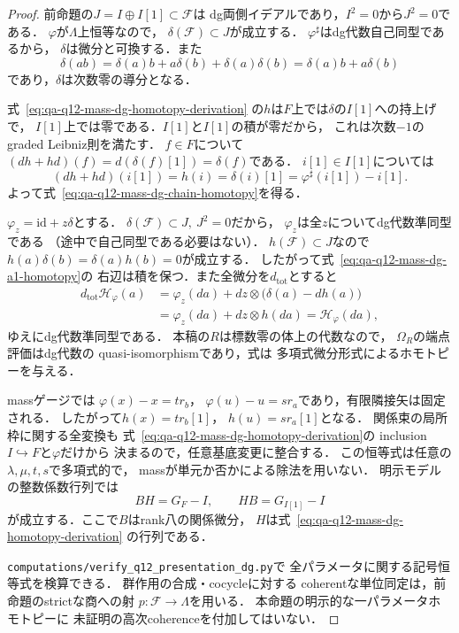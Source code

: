 \begin{proof}
前命題の$J=I\oplus I[1]\subset\mathscr F$は
dg両側イデアルであり，$I^2=0$から$J^2=0$である．
$\varphi$が$\Lambda$上恒等なので，
$\delta(\mathscr F)\subset J$が成立する．
$\varphi^\sharp$はdg代数自己同型であるから，
$\delta$は微分と可換する．また
\[
 \delta(ab)=\delta(a)b+a\delta(b)+\delta(a)\delta(b)
           =\delta(a)b+a\delta(b)
\]
であり，$\delta$は次数零の導分となる．

式~\eqref{eq:qa-q12-mass-dg-homotopy-derivation}
の$h$は$F$上では$\delta$の$I[1]$への持上げで，
$I[1]$上では零である．$I[1]$と$I[1]$の積が零だから，
これは次数$-1$のgraded Leibniz則を満たす．
$f\in F$について
$(dh+hd)(f)=d(\delta(f)[1])=\delta(f)$である．
$i[1]\in I[1]$については
\[
 (dh+hd)(i[1])=h(i)=\delta(i)[1]
             =\varphi^\sharp(i[1])-i[1] .
\]
よって式~\eqref{eq:qa-q12-mass-dg-chain-homotopy}を得る．

$\varphi_z=\mathrm{id}+z\delta$とする．
$\delta(\mathscr F)\subset J,\ J^2=0$だから，
$\varphi_z$は全$z$についてdg代数準同型である
（途中で自己同型である必要はない）．
$h(\mathscr F)\subset J$なので
$h(a)\delta(b)=\delta(a)h(b)=0$が成立する．
したがって式~\eqref{eq:qa-q12-mass-dg-a1-homotopy}の
右辺は積を保つ．また全微分を$d_{\mathrm{tot}}$とすると
\[
 \begin{aligned}
 d_{\mathrm{tot}}\mathscr H_\varphi(a)
 &=\varphi_z(da)+dz\otimes
       \bigl(\delta(a)-dh(a)\bigr)\\
 &=\varphi_z(da)+dz\otimes h(da)
  =\mathscr H_\varphi(da),
 \end{aligned}
\]
ゆえにdg代数準同型である．
本稿の$R$は標数零の体上の代数なので，
$\Omega_R$の端点評価はdg代数の
quasi-isomorphismであり，式は
多項式微分形式によるホモトピーを与える．

massゲージでは
$\varphi(x)-x=t r_b$，
$\varphi(u)-u=s r_a$であり，有限隣接矢は固定される．
したがって$h(x)=t r_b[1]$，
$h(u)=s r_a[1]$となる．
関係束の局所枠に関する全変換も
式~\eqref{eq:qa-q12-mass-dg-homotopy-derivation}の
inclusion $I\hookrightarrow F$と$\varphi$だけから
決まるので，任意基底変更に整合する．
この恒等式は任意の$\lambda,\mu,t,s$で多項式的で，
massが単元か否かによる除法を用いない．
明示モデルの整数係数行列では
\[
 BH=G_F-I,\qquad HB=G_{I[1]}-I
\]
が成立する．ここで$B$はrank八の関係微分，
$H$は式~\eqref{eq:qa-q12-mass-dg-homotopy-derivation}
の行列である．

\noindent\texttt{computations/verify\_q12\_presentation\_dg.py}で
全パラメータに関する記号恒等式を検算できる．
群作用の合成・cocycleに対する
coherentな単位同定は，前命題のstrictな商への射
$p:\mathscr F\to\Lambda$を用いる．
本命題の明示的な一パラメータホモトピーに
未証明の高次coherenceを付加してはいない．
\end{proof}

